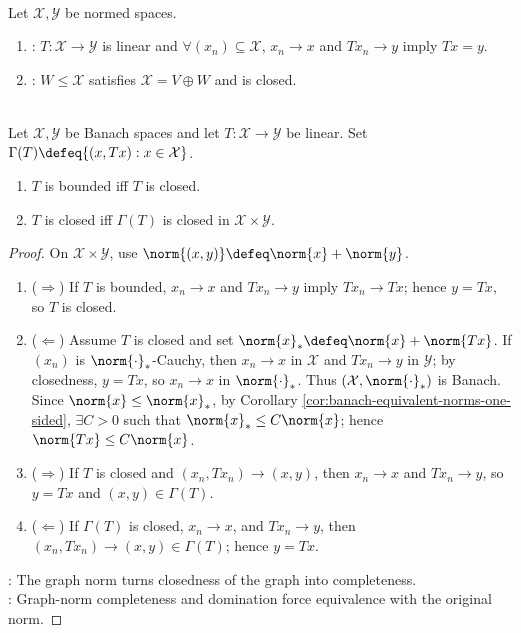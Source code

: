 \begin{definition} \label{def:closed-operator-and-closed-complement} \\
Let $\mathcal{X},\mathcal{Y}$ be normed spaces.
\begin{enumerate}[label=(\roman*)]
\setlength{\itemsep}{0pt}
\item {}: $T:\mathcal{X}\to\mathcal{Y}$ is linear and $\forall(x_n)\subseteq\mathcal{X}$, $x_n\to x$ and $Tx_n\to y$ imply $Tx=y$.
\item {}: $W\leq\mathcal{X}$ satisfies $\mathcal{X}=V\oplus W$ and is closed.
\end{enumerate}
\end{definition}

\begin{theorem} \label{thm:closed-graph-theorem} \\
Let $\mathcal{X},\mathcal{Y}$ be Banach spaces and let $T:\mathcal{X}\to\mathcal{Y}$ be linear. Set $\Gamma(T)\defeq\{(x,Tx):x\in\mathcal{X}\}$.
\begin{enumerate}[label=(\roman*)]
\setlength{\itemsep}{0pt}
\item $T$ is bounded iff $T$ is closed.
\item $T$ is closed iff $\Gamma(T)$ is closed in $\mathcal{X}\times\mathcal{Y}$.
\end{enumerate}
\begin{proof}
On $\mathcal X\times\mathcal Y$, use $\norm{(x,y)}\defeq\norm{x}+\norm{y}$.
\begin{enumerate}[label=(\roman*)]
\setlength{\itemsep}{0pt}
\item[$(i)$] ($\Rightarrow$) If $T$ is bounded, $x_n\to x$ and $Tx_n\to y$ imply $Tx_n\to Tx$; hence $y=Tx$, so $T$ is closed.
\item[$(i)$] ($\Leftarrow$) Assume $T$ is closed and set $\norm{x}_*\defeq\norm{x}+\norm{Tx}$. If $(x_n)$ is $\norm{\cdot}_*$-Cauchy, then $x_n\to x$ in $\mathcal X$ and $Tx_n\to y$ in $\mathcal Y$; by closedness, $y=Tx$, so $x_n\to x$ in $\norm{\cdot}_*$. Thus $(\mathcal X,\norm{\cdot}_*)$ is Banach.\\
Since $\norm{x}\leq\norm{x}_*$, by Corollary \ref{cor:banach-equivalent-norms-one-sided}, $\exists C>0$ such that $\norm{x}_*\leq C\norm{x}$; hence $\norm{Tx}\leq C\norm{x}$.
\item[$(ii)$] ($\Rightarrow$) If $T$ is closed and $(x_n,Tx_n)\to(x,y)$, then $x_n\to x$ and $Tx_n\to y$, so $y=Tx$ and $(x,y)\in\Gamma(T)$.
\item[$(ii)$] ($\Leftarrow$) If $\Gamma(T)$ is closed, $x_n\to x$, and $Tx_n\to y$, then $(x_n,Tx_n)\to(x,y)\in\Gamma(T)$; hence $y=Tx$.
\end{enumerate}
: The graph norm turns closedness of the graph into completeness.\\
: Graph-norm completeness and domination force equivalence with the original norm.
\end{proof}
\end{theorem}

